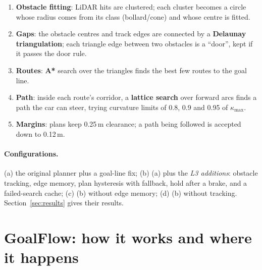 \documentclass[11pt,a4paper]{article}
\newcommand{\term}[1]{\textbf{#1}}
\begin{document}
\begin{enumerate}[nosep]
  \item \textbf{Obstacle fitting}: LiDAR hits are clustered; each cluster becomes a circle whose radius
        comes from its class (bollard/cone) and whose centre is fitted.
  \item \textbf{Gaps}: the obstacle centres and track edges are connected by a \term{Delaunay
        triangulation}; each triangle edge between two obstacles is a ``door'', kept if it passes the
        door rule.
  \item \textbf{Routes}: \term{A*} search over the triangles finds the best few routes to the goal line.
  \item \textbf{Path}: inside each route's corridor, a \term{lattice search} over forward arcs finds a path
        the car can steer, trying curvature limits of 0.8, 0.9 and 0.95 of $\kappa_{\max}$.
  \item \textbf{Margins}: plans keep 0.25\,m clearance; a path being followed is accepted down to 0.12\,m.
\end{enumerate}

\paragraph{Configurations.} (a) the original planner plus a goal-line fix; (b) (a) plus the \emph{L3
additions}: obstacle tracking, edge memory, plan hysteresis with fallback, hold after a brake, and a
failed-search cache; (c) (b) without edge memory; (d) (b) without tracking. Section~\ref{sec:results}
gives their results.

\section{GoalFlow: how it works and where it happens}
\end{document}
